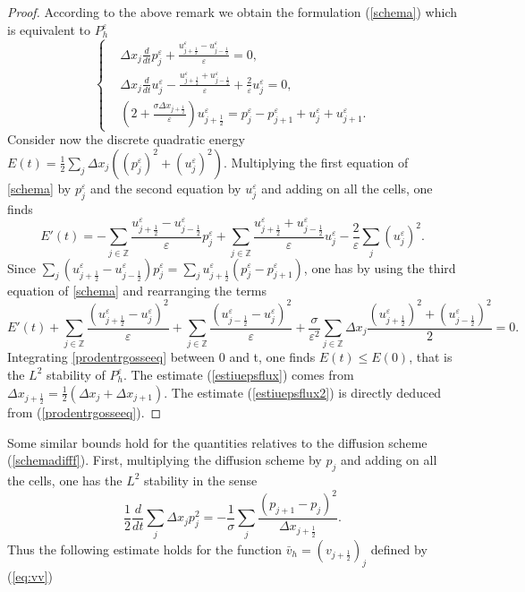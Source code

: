 \documentclass[a4paper,french,english,10pt]{article}
\newcommand\eps{\varepsilon}
\begin{document}
\begin{proof}
According to the above remark we obtain  
the formulation 
(\ref{schema}) 
which is 
equivalent to $P_h^\eps$
\begin{equation}\label{schema}
\left\{
\begin{aligned}
&\Delta x_j\frac{d}{dt}p^{\eps}_j +\frac{u_{j+\frac12 }^{\eps} -
u_{j-\frac12 }^{\eps} }{\eps} = 0,\\
&\Delta x_j\frac{d}{dt}u^{\eps}_j-\frac{u_{j+\frac12 }^{\eps}+
u_{j-\frac12 }^{\eps}}{\eps} +\frac{2}{\eps}u_j^{\eps}=0, \\
&
\left( 2
+\frac{\sigma \Delta x_{j+\frac12}
 }{\eps}
\right) u_{j+\frac12 }^{\eps} 
=p^{\eps}_j-p^{\eps}_{j+1}+u^{\eps}_j+u^{\eps}_{j+1}
.
\end{aligned}
\right.
\end{equation}
Consider now the discrete quadratic energy
$E(t)=\frac12 \sum_j \Delta x_j ((p^{\eps}_j)^2+(u^{\eps}_j)^2)$.
 Multiplying the first equation of \eqref{schema} by $p_j^{\eps}$ and the second
equation by $u_j^{\eps}$ and adding on all the cells, one finds
\begin{equation*}
 E'(t)=-\sum_{j\in \mathbb{Z}} \frac{
u_{j+\frac12 }^{\eps}-u_{j-\frac12 }^{\eps}}{\eps}p^{\eps}_j + \sum_{j\in
\mathbb{Z}} \frac{
u_{j+\frac12 }^{\eps}+u_{j-\frac12 }^{\eps}}{\eps}u^{\eps}_j
-\frac{2}{\eps}\sum_j (u^{\eps}_j)^2.
\end{equation*}
Since $
\sum_{j}(
u_{j+\frac12 }^{\eps}-u_{j-\frac12 }^{\eps})p^{\eps}_j =
\sum_{j} u_{j+\frac12 }^{\eps}(p^{\eps}_j-p^{\eps}_{j+1})$, one
has  by using the third equation of \eqref{schema} and rearranging the
terms
\begin{equation}\label{prodentrgosseeq}
E'(t)+\sum_{j\in \mathbb{Z}} \frac{
(u_{j+\frac12 }^{\eps}-u^{\eps}_j)^2 }{\eps}+\sum_{j\in \mathbb{Z}} \frac{
(u_{j-\frac12 }^{\eps}-u^{\eps}_j)^2 }{\eps} +
\frac{\sigma}{\eps^2}\sum_{j\in \mathbb{Z}} \Delta x_{j}
\frac{(u_{j+\frac12 }^{\eps})^2+(u_{j-\frac12 }^{\eps})^2}{2}= 0.
\end{equation}
Integrating  \eqref{prodentrgosseeq} between 0 and t, one finds  $E(t)\leq E(0)$, that is the $L^2$ stability of $P_h^\eps$.
The estimate  (\ref{estiuepsflux}) 
comes from 
$\Delta x_{j+\frac12}=\frac12( \Delta x_{j}+\Delta x_{j+1})$. The estimate 
 (\ref{estiuepsflux2}) is directly deduced from
(\ref{prodentrgosseeq}).
\end{proof}


Some similar bounds hold 
for  the quantities relatives to the diffusion scheme (\ref{schemadifff}).
First, multiplying the diffusion scheme by $p_j$ and adding on all the cells,
one has the $L^2$ stability in the sense
\begin{equation*}
\frac12 \frac{d}{dt}\sum_j \Delta x_jp_j^2=-\frac{1}{\sigma}\sum_j
\frac{(p_{j+1}-p_j)^2}{\Delta x_{j+\frac12 }}.
\end{equation*}
Thus 
the following estimate holds for
 the function 
$\bar{v}_h=\left( v_{j+\frac12}  \right)_j$ defined by
(\ref{eq:vv})  
 
\end{document}
